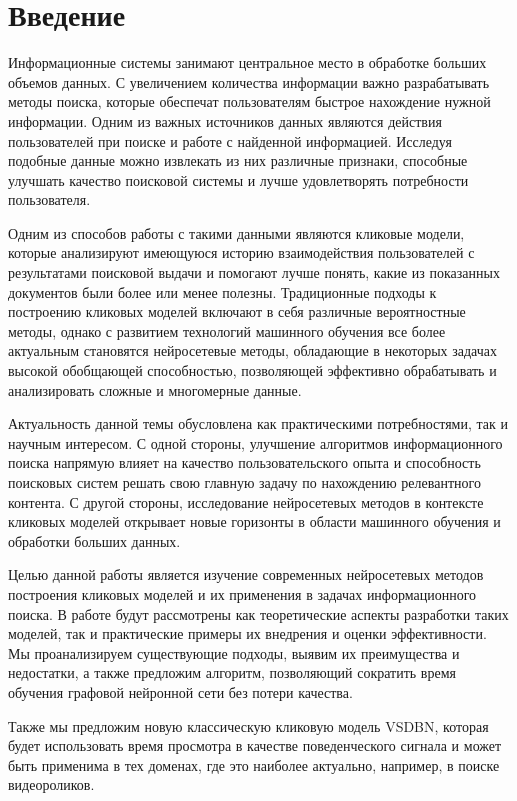 \documentclass[diploma]{nanolab2015}
\begin{document}

\setcounter{page}{3}
\clearpage
\tableofcontents{}  %
\clearpage
\chapter{Введение}
Информационные системы занимают центральное место в обработке больших объемов данных. С увеличением количества информации важно разрабатывать методы поиска, которые обеспечат пользователям быстрое нахождение нужной информации. Одним из важных источников данных являются действия пользователей при поиске и работе с найденной информацией. Исследуя подобные данные можно извлекать из них различные признаки, способные улучшать качество поисковой системы и лучше удовлетворять потребности пользователя.

Одним из способов работы с такими данными являются кликовые модели, которые анализируют имеющуюся историю взаимодействия пользователей с результатами поисковой выдачи и помогают лучше понять, какие из показанных документов были более или менее полезны. Традиционные подходы к построению кликовых моделей включают в себя различные вероятностные методы, однако с развитием технологий машинного обучения все более актуальным становятся нейросетевые методы, обладающие в некоторых задачах высокой обобщающей способностью, позволяющей эффективно обрабатывать и анализировать сложные и многомерные данные.

Актуальность данной темы обусловлена как практическими потребностями, так и научным интересом. С одной стороны, улучшение алгоритмов информационного поиска напрямую влияет на качество пользовательского опыта и способность поисковых систем решать свою главную задачу по нахождению релевантного контента. С другой стороны, исследование нейросетевых методов в контексте кликовых моделей открывает новые горизонты в области машинного обучения и обработки больших данных.

Целью данной работы является изучение современных нейросетевых методов построения кликовых моделей и их применения в задачах информационного поиска. В работе будут рассмотрены как теоретические аспекты разработки таких моделей, так и практические примеры их внедрения и оценки эффективности. Мы проанализируем существующие подходы, выявим их преимущества и недостатки, а также предложим алгоритм, позволяющий сократить время обучения графовой нейронной сети без потери качества.

Также мы предложим новую классическую кликовую модель VSDBN, которая будет использовать время просмотра в качестве поведенческого сигнала и может быть применима в тех доменах, где это наиболее актуально, например, в поиске видеороликов. 
\newpage
\end{document}

